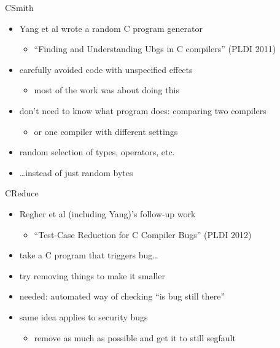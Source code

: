 \begin{frame}{CSmith}
    \begin{itemize}
    \item Yang et al wrote a random C program generator
        \begin{itemize}
        \item ``Finding and Understanding Ubgs in C compilers'' (PLDI 2011)
        \end{itemize}
    \vspace{.5cm}
    \item carefully avoided code with unspecified effects
        \begin{itemize}
        \item most of the work was about doing this
        \end{itemize}
    \item don't need to know what program does: comparing two compilers
        \begin{itemize}
        \item or one compiler with different settings
        \end{itemize}
    \vspace{.5cm}
    \item random selection of types, operators, etc.
    \item \ldots instead of just random bytes
    \end{itemize}
\end{frame}

\begin{frame}{CReduce}
    \begin{itemize}
    \item Regher et al (including Yang)'s follow-up work
        \begin{itemize}
        \item ``Test-Case Reduction for C Compiler Bugs'' (PLDI 2012)
        \end{itemize}
    \item take a C program that triggers bug\ldots
    \item try removing things to make it smaller
    \item needed: automated way of checking ``is bug still there''
    \vspace{.5cm}
    \item same idea applies to security bugs
        \begin{itemize}
        \item remove as much as possible and get it to still segfault
        \end{itemize}
    \end{itemize}
\end{frame}
